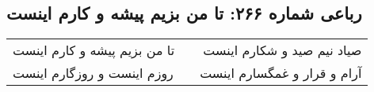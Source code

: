 \begin{center}
\section*{رباعی شماره ۲۶۶: تا من بزیم پیشه و کارم اینست}
\label{sec:0266}
\begin{longtable}{l p{0.5cm} r}
تا من بزیم پیشه و کارم اینست
&&
صیاد نیم صید و شکارم اینست
\\
روزم اینست و روزگارم اینست
&&
آرام و قرار و غمگسارم اینست
\\
\end{longtable}
\end{center}
